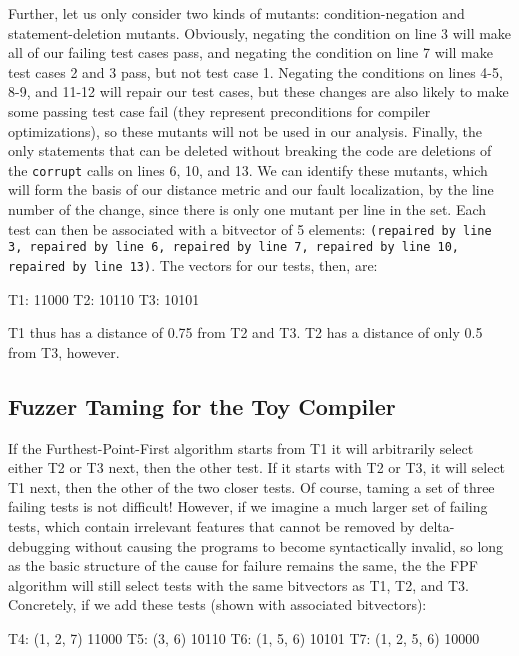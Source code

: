 Further, let us only consider two kinds of mutants:
condition-negation and statement-deletion mutants.  Obviously,
negating the condition on line 3 will make all of our failing test
cases pass, and negating the condition on line 7 will make test cases
2 and 3 pass, but not test case 1.  Negating the conditions on lines
4-5, 8-9, and 11-12 will repair our test cases, but these changes are
also likely to make some passing test case fail (they represent
preconditions for compiler optimizations), so these mutants will not
be used in our analysis.  Finally, the only statements that can be deleted without breaking the code are deletions of the {\tt corrupt} calls on lines 6, 10, and 13.  We can identify these mutants, which will form the basis of our distance metric and our fault localization, by the line number of the change, since there is only one mutant per line in the set.  Each test can then be associated with a bitvector of 5 elements:  {\tt (repaired by line 3, repaired by line 6, repaired by line 7, repaired by line 10, repaired by line 13)}.  The vectors for our tests, then, are:

\begin{code}
T1: 11000
T2: 10110
T3: 10101
\end{code}

T1 thus has a distance of 0.75 from T2 and T3.  T2 has
a distance of only 0.5 from T3, however.  

\subsection{Fuzzer Taming for the Toy Compiler}

If the Furthest-Point-First
algorithm starts from T1 it will arbitrarily select either T2
or T3 next, then the other test.  If it starts with T2 or T3, it
will select T1 next, then the other of the two closer tests.  Of
course, taming a set of three failing tests is not difficult!
However, if we imagine a much larger set of failing tests, which
contain irrelevant features that cannot be removed by delta-debugging
without causing the programs to become syntactically invalid, so long
as the basic structure of the cause for failure remains the same, the
the FPF algorithm will still select tests with the same bitvectors as
T1, T2, and T3.  Concretely, if we add these tests (shown with associated bitvectors):

\begin{code}
T4: (1, 2, 7)    11000
T5: (3, 6)       10110
T6: (1, 5, 6)    10101
T7: (1, 2, 5, 6) 10000
\end{code}

